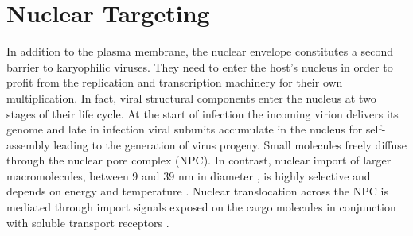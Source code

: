 



\section{Nuclear Targeting}
\label{Localization}      
In addition to the plasma membrane, the nuclear envelope constitutes a second barrier to karyophilic viruses. They need to enter the host's nucleus in order to profit from the replication and transcription machinery for their own multiplication. In fact, viral structural components enter the nucleus at two stages of their life cycle. At the start of infection the incoming virion delivers its genome and late in infection viral subunits accumulate in the nucleus for self-assembly leading to the generation of virus progeny. Small molecules freely diffuse through the nuclear pore complex (NPC). In contrast, nuclear import of larger macromolecules, between 9 and 39 nm in diameter \cite{pmid11854401}, is highly selective and depends on energy and temperature \cite{pmid9428689}. Nuclear translocation across the NPC is mediated through import signals exposed on the cargo molecules in conjunction with soluble transport receptors \cite{pmid14570049, pmid14504656, pmid15702987}. 

